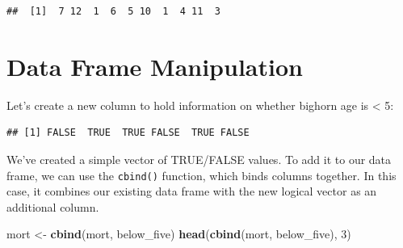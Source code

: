 \documentclass[
]{book}
\newenvironment{Shaded}{\begin{snugshade}}{\end{snugshade}}
\newcommand{\DecValTok}[1]{\textcolor[rgb]{0.00,0.00,0.81}{#1}}
\newcommand{\FunctionTok}[1]{\textcolor[rgb]{0.13,0.29,0.53}{\textbf{#1}}}
\newcommand{\NormalTok}[1]{#1}
\newcommand{\OtherTok}[1]{\textcolor[rgb]{0.56,0.35,0.01}{#1}}
\newcommand{\SpecialCharTok}[1]{\textcolor[rgb]{0.81,0.36,0.00}{\textbf{#1}}}
\begin{document}
\begin{verbatim}
##  [1]  7 12  1  6  5 10  1  4 11  3
\end{verbatim}

\section{Data Frame Manipulation}\label{data-frame-manipulation}

Let's create a new column to hold information on whether bighorn age is \textless{} 5:

\begin{Shaded}
\end{Shaded}

\begin{verbatim}
## [1] FALSE  TRUE  TRUE FALSE  TRUE FALSE
\end{verbatim}

We've created a simple vector of TRUE/FALSE values. To add it to our data frame, we can use the \texttt{cbind()} function, which binds columns together. In this case, it combines our existing data frame with the new logical vector as an additional column.

\begin{Shaded}
\begin{Highlighting}[]
\NormalTok{mort }\OtherTok{\textless{}{-}} \FunctionTok{cbind}\NormalTok{(mort, below\_five)}
\FunctionTok{head}\NormalTok{(}\FunctionTok{cbind}\NormalTok{(mort, below\_five), }\DecValTok{3}\NormalTok{)}
\end{Highlighting}
\end{Shaded}
\end{document}
